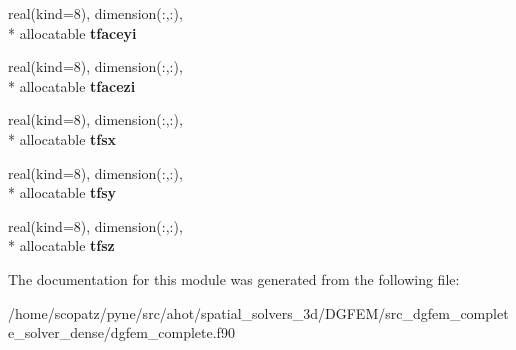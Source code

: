 \begin{DoxyCompactItemize}
\item 
\hypertarget{classdgfem__complete_af85bf1e05f71c76d98d526af5136dee1}{real(kind=8), dimension(\-:,\-:), \\*
allocatable {\bfseries tfaceyi}}\label{classdgfem__complete_af85bf1e05f71c76d98d526af5136dee1}

\item 
\hypertarget{classdgfem__complete_a0285def64a53bc7571d814fc42c792fa}{real(kind=8), dimension(\-:,\-:), \\*
allocatable {\bfseries tfacezi}}\label{classdgfem__complete_a0285def64a53bc7571d814fc42c792fa}

\item 
\hypertarget{classdgfem__complete_a55847a58d7ae96c99ccf66d1011e6e81}{real(kind=8), dimension(\-:,\-:), \\*
allocatable {\bfseries tfsx}}\label{classdgfem__complete_a55847a58d7ae96c99ccf66d1011e6e81}

\item 
\hypertarget{classdgfem__complete_aac557b89d76ddb045babcaad8fa46e3f}{real(kind=8), dimension(\-:,\-:), \\*
allocatable {\bfseries tfsy}}\label{classdgfem__complete_aac557b89d76ddb045babcaad8fa46e3f}

\item 
\hypertarget{classdgfem__complete_a49f986fbeac48027410bd2e2a2736057}{real(kind=8), dimension(\-:,\-:), \\*
allocatable {\bfseries tfsz}}\label{classdgfem__complete_a49f986fbeac48027410bd2e2a2736057}

\end{DoxyCompactItemize}


The documentation for this module was generated from the following file\-:\begin{DoxyCompactItemize}
\item 
/home/scopatz/pyne/src/ahot/spatial\-\_\-solvers\-\_\-3d/\-D\-G\-F\-E\-M/src\-\_\-dgfem\-\_\-complete\-\_\-solver\-\_\-dense/dgfem\-\_\-complete.\-f90\end{DoxyCompactItemize}
